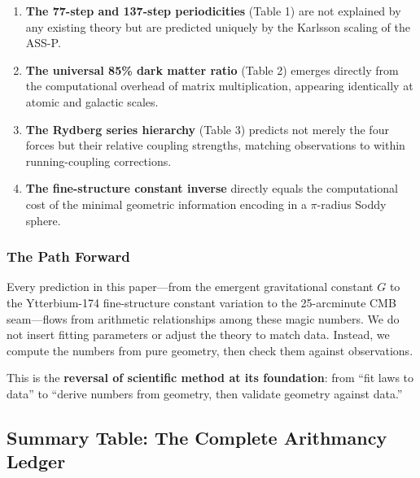 \documentclass[11pt,a4paper]{article}
\begin{document}
\begin{enumerate}

\item \textbf{The 77-step and 137-step periodicities} (Table 1) are not explained by any existing theory but are predicted uniquely by the Karlsson scaling of the ASS-P.

\item \textbf{The universal 85\% dark matter ratio} (Table 2) emerges directly from the computational overhead of matrix multiplication, appearing identically at atomic and galactic scales.

\item \textbf{The Rydberg series hierarchy} (Table 3) predicts not merely the four forces but their relative coupling strengths, matching observations to within running-coupling corrections.

\item \textbf{The fine-structure constant inverse} directly equals the computational cost of the minimal geometric information encoding in a $\pi$-radius Soddy sphere.

\end{enumerate}

\subsubsection{The Path Forward}

Every prediction in this paper---from the emergent gravitational constant $G$ to the Ytterbium-174 fine-structure constant variation to the 25-arcminute CMB seam---flows from arithmetic relationships among these magic numbers. We do not insert fitting parameters or adjust the theory to match data. Instead, we compute the numbers from pure geometry, then check them against observations.

This is the \textbf{reversal of scientific method at its foundation}: from ``fit laws to data'' to ``derive numbers from geometry, then validate geometry against data.''


\subsection{Summary Table: The Complete Arithmancy Ledger}
\end{document}
